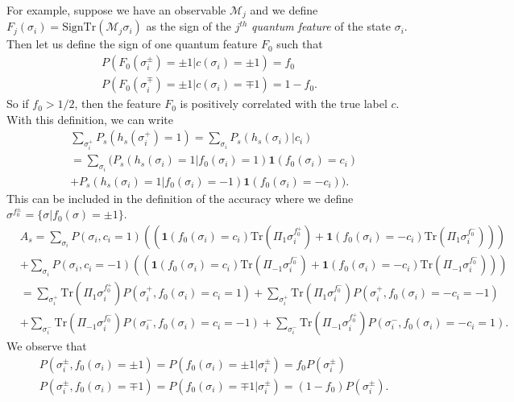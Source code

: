 \documentclass[onecolumn,prx, superscriptaddress,longbibliography,margin=1mm 11pt]{revtex4-2}
\renewcommand{\mathbf}[1]{\boldsymbol{#1}}
\begin{document}
For example, suppose we have an observable $\mathcal{M}_j$ and we define $F_j(\sigma_i)=\text{Sign}\text{Tr}(\mathcal{M}_j\sigma_i)$ as the sign of the $j^{th}$ \textit{quantum feature} of the state $\sigma_i$. Then let us define the sign of one quantum feature $F_0$ such that 
\begin{align}
    \nonumber P(F_0(\sigma^{\pm}_i)=\pm 1|c(\sigma_i)=\pm 1)=f_0 \\
    \nonumber P(F_0(\sigma^{\mp}_i)=\pm 1|c(\sigma_i)=\mp 1)=1-f_0.
\end{align}
So if $f_0>1/2$, then the feature $F_0$ is positively correlated with the true label $c$. With this definition, we can write 
\begin{align}
    &\sum_{\sigma^+_i} P_s(h_s(\sigma^+_i)=1)=\sum_{\sigma_i}P_s(h_s(\sigma_i)|c_i) \nonumber \\
    &=\sum_{\sigma_i}(P_s(h_s(\sigma_i)=1|f_0(\sigma_i)=1)\mathbf{1}(f_0(\sigma_i)=c_i)\nonumber \\
    &+P_s(h_s(\sigma_i)=1|f_0(\sigma_i)=-1)\mathbf{1}(f_0(\sigma_i)=-c_i)).
\end{align}
This can be included in the definition of the accuracy where we define $\sigma^{f_0^{\pm}}=\{\sigma| f_0(\sigma)=\pm 1\}$.
\begin{align}
    &A_s=\sum_{\sigma_i}P(\sigma_i, c_i=1) ((\mathbf{1}(f_0(\sigma_i)=c_i)\text{Tr}(\Pi_1 \sigma^{f_0^+}_i)+\mathbf{1}(f_0(\sigma_i)=-c_i)\text{Tr}(\Pi_1\sigma^{f_0^{-}}_i))) \nonumber \\
    &+\sum_{\sigma_i}P(\sigma_i, c_i=-1) ((\mathbf{1}(f_0(\sigma_i)=c_i)\text{Tr}(\Pi_{-1} \sigma^{f_0^-}_i) +\mathbf{1}(f_0(\sigma_i)=-c_i)\text{Tr}(\Pi_{-1}\sigma^{f_0^{-}}_i))) \nonumber \\
    &=\sum_{\sigma_i^+}\text{Tr}(\Pi_1 \sigma^{f_0^+}_i)P(\sigma^+_i, f_0(\sigma_i)=c_i=1) +\sum_{\sigma_i^+}\text{Tr}(\Pi_1 \sigma^{f_0^-}_i)P(\sigma^+_i, f_0(\sigma_i)=-c_i=-1) \nonumber \\
    &+\sum_{\sigma_i^-}\text{Tr}(\Pi_{-1} \sigma^{f_0^-}_i)P(\sigma^-_i, f_0(\sigma_i)=c_i=-1) +\sum_{\sigma_i^-}\text{Tr}(\Pi_{-1} \sigma^{f_0^+}_i)P(\sigma^-_i, f_0(\sigma_i)=-c_i=1).
\end{align}
We observe that
\begin{align}
   & P(\sigma^{\pm}_i,f_0(\sigma_i)=\pm 1)=P(f_0(\sigma_i)=\pm 1|\sigma^{\pm}_i)=f_0 P(\sigma^{\pm}_i) \nonumber \\
   & P(\sigma^{\pm}_i,f_0(\sigma_i)=\mp 1)=P(f_0(\sigma_i)=\mp 1|\sigma^{\pm}_i)=(1-f_0) P(\sigma^{\pm}_i).
\end{align}
\end{document}
